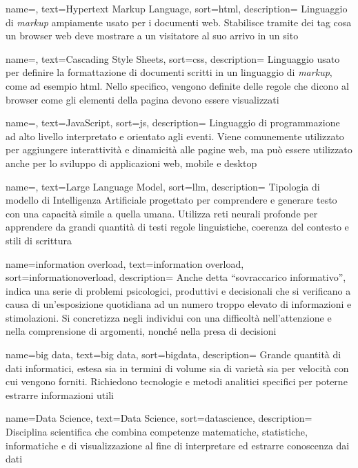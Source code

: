  {
    name=,
    text=Hypertext Markup Language,
    sort=html,
    description=
    {Linguaggio di \emph{markup} ampiamente usato per i documenti web.
    Stabilisce tramite dei tag cosa un browser web deve mostrare a un visitatore al suo arrivo in un sito}
}

 {
    name=,
    text=Cascading Style Sheets,
    sort=css,
    description=
    {Linguaggio usato per definire la formattazione di documenti scritti in un linguaggio di \emph{markup}, come ad esempio \gls{html}.
    Nello specifico, vengono definite delle regole che dicono al browser come gli elementi della pagina devono essere visualizzati}
}

 {
    name=,
    text=JavaScript,
    sort=js,
    description=
    {Linguaggio di programmazione ad alto livello interpretato e orientato agli eventi. Viene comunemente utilizzato per aggiungere interattività e dinamicità alle pagine web, 
    ma può essere utilizzato anche per lo sviluppo di applicazioni web, mobile e desktop}
}

 {
    name=,
    text=Large Language Model,
    sort=llm,
    description=
    {Tipologia di modello di Intelligenza Artificiale progettato per comprendere e generare testo con una capacità simile a quella umana. 
    Utilizza reti neurali profonde per apprendere da grandi quantità di testi regole linguistiche, coerenza del contesto e stili di scrittura}
}

 {
    name=information overload,
    text=information overload,
    sort=informationoverload,
    description=
    {Anche detta ``sovraccarico informativo'', indica una serie di problemi psicologici, produttivi e decisionali che si verificano a causa di un'esposizione quotidiana 
    ad un numero troppo elevato di informazioni e stimolazioni.
    Si concretizza negli individui con una difficoltà nell'attenzione e nella comprensione di argomenti, nonché nella presa di decisioni}
}

 {
    name=big data,
    text=big data,
    sort=bigdata,
    description=
    {Grande quantità di dati informatici, estesa sia in termini di volume sia di varietà sia per velocità con cui vengono forniti. 
    Richiedono tecnologie e metodi analitici specifici per poterne estrarre informazioni utili}
}

 {
    name=Data Science,
    text=Data Science,
    sort=datascience,
    description=
    {Disciplina scientifica che combina competenze matematiche, statistiche, informatiche e di visualizzazione al fine di interpretare ed estrarre conoscenza dai dati}
}


